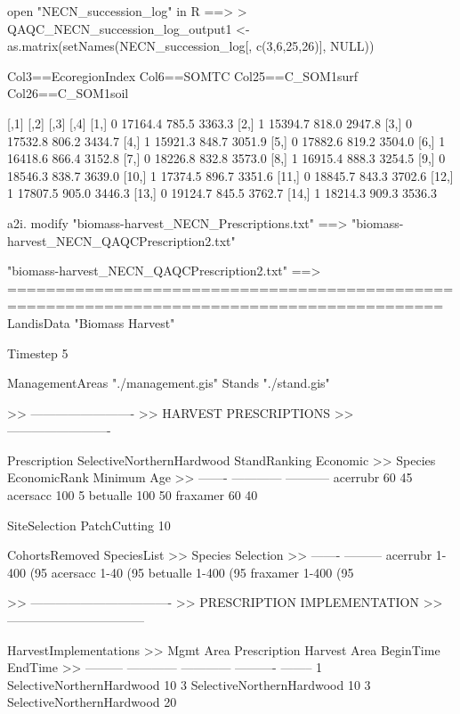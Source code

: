 open "NECN_succession_log" in R ==>
> QAQC_NECN_succession_log_output1 <- as.matrix(setNames(NECN_succession_log[, c(3,6,25,26)], NULL))

Col3==EcoregionIndex
Col6==SOMTC
Col25==C_SOM1surf
Col26==C_SOM1soil

      [,1]    [,2]  [,3]   [,4]
 [1,]    0 17164.4 785.5 3363.3
 [2,]    1 15394.7 818.0 2947.8
 [3,]    0 17532.8 806.2 3434.7
 [4,]    1 15921.3 848.7 3051.9
 [5,]    0 17882.6 819.2 3504.0
 [6,]    1 16418.6 866.4 3152.8
 [7,]    0 18226.8 832.8 3573.0
 [8,]    1 16915.4 888.3 3254.5
 [9,]    0 18546.3 838.7 3639.0
[10,]    1 17374.5 896.7 3351.6
[11,]    0 18845.7 843.3 3702.6
[12,]    1 17807.5 905.0 3446.3
[13,]    0 19124.7 845.5 3762.7
[14,]    1 18214.3 909.3 3536.3







	a2i. modify "biomass-harvest_NECN_Prescriptions.txt"
		==> "biomass-harvest_NECN_QAQCPrescription2.txt"

"biomass-harvest_NECN_QAQCPrescription2.txt" ==> 
===========================================================================================
LandisData  "Biomass Harvest"


Timestep    5

ManagementAreas 	"./management.gis"
Stands     		 "./stand.gis"



>> -------------------------
>> HARVEST PRESCRIPTIONS
>> -------------------------

Prescription SelectiveNorthernHardwood
    StandRanking    Economic
>>	Species 	EconomicRank	 Minimum Age
>>	------- 	------------ 	-----------
    	acerrubr   	60 	     	45
    	acersacc   	100          	5
    	betualle   	100	     	50
    	fraxamer   	60	     	40

    SiteSelection PatchCutting 10%

    CohortsRemoved SpeciesList
>>	Species		Selection
>>	-------		---------
	acerrubr   	1-400 (95%
	acersacc   	1-40 (95%
	betualle   	1-400 (95%
	fraxamer   	1-400 (95%


    


>> ----------------------------------
>> PRESCRIPTION IMPLEMENTATION 
>> ---------------------------------

    HarvestImplementations
>>	Mgmt Area	Prescription		Harvest Area	BeginTime	EndTime
>> 	---------   	------------   		------------   	---------- 	--------
	1		SelectiveNorthernHardwood	10%
	3		SelectiveNorthernHardwood	10%
	3		SelectiveNorthernHardwood	20%

